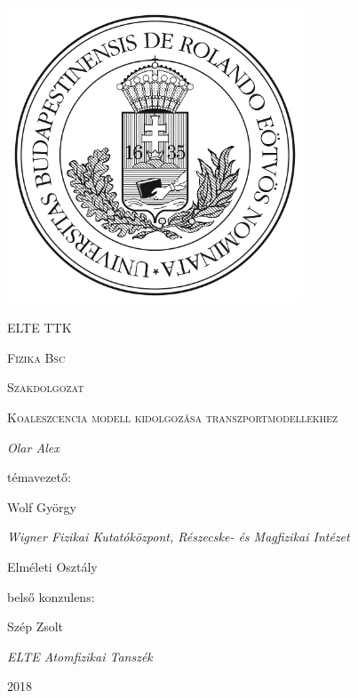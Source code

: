 \documentclass[a4paper,12pt]{article}
\begin{document}
\begin{titlepage}

	\centering
	
	\includegraphics[width=0.66\textwidth]{elte.jpg}
	\par\vspace{1cm}
	{\scshape\LARGE ELTE TTK \par}
	{\scshape\large Fizika Bsc \par}
	\vspace{1cm}
	
	{\scshape\LARGE Szakdolgozat \par}
	\vspace{.5cm}
	
	{\scshape\Large Koaleszcencia modell kidolgozása transzportmodellekhez\par}
	\vspace{0.2cm}
	{\Large\itshape Olar Alex\par}
	
	\vfill
	
	témavezető:\par
	{\Large Wolf György\par}
	{\itshape Wigner Fizikai Kutatóközpont, Részecske- és Magfizikai Intézet\par Elméleti Osztály}
	
	\vfill
	
	belső konzulens:\par
	{\large Szép Zsolt\par}
	{\itshape ELTE Atomfizikai Tanszék}

	\vfill

	{\large 2018 \par}
	
\end{titlepage}
\end{document}
